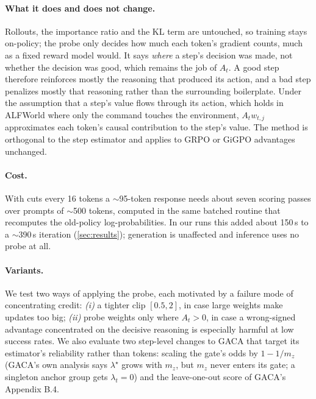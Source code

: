 \paragraph{What it does and does not change.}
Rollouts, the importance ratio and the KL term are untouched, so training stays on-policy; the probe
only decides how much each token's gradient counts, much as a fixed reward model would. It says
\emph{where} a step's decision was made, not whether the decision was good, which remains the job of
$A_t$. A good step therefore reinforces mostly the reasoning that produced its action, and a bad step
penalizes mostly that reasoning rather than the surrounding boilerplate. Under the assumption that a
step's value flows through its action, which holds in ALFWorld where only the command touches the
environment, $A_t w_{t,j}$ approximates each token's causal contribution to the step's value. The
method is orthogonal to the step estimator and applies to GRPO or GiGPO advantages unchanged.

\paragraph{Cost.}
With cuts every 16 tokens a $\sim$95-token response needs about seven scoring passes over prompts of
$\sim$500 tokens, computed in the same batched routine that recomputes the old-policy log-probabilities.
In our runs this added about 150\,s to a $\sim$390\,s iteration (\cref{sec:results}); generation is
unaffected and inference uses no probe at all.

\paragraph{Variants.}
We test two ways of applying the probe, each motivated by a failure mode of concentrating credit:
\emph{(i)} a tighter clip $[0.5, 2]$, in case large weights make updates too big;
\emph{(ii)} probe weights only where $A_t > 0$, in case a wrong-signed advantage concentrated on the
decisive reasoning is especially harmful at low success rates. We also evaluate two step-level changes to GACA
that target its estimator's reliability rather than tokens: scaling the gate's odds by
$1 - 1/m_z$ (GACA's own analysis says $\lambda^\star$ grows with $m_z$, but $m_z$ never enters its gate;
a singleton anchor group gets $\lambda_t = 0$) and the leave-one-out score of GACA's Appendix B.4.
